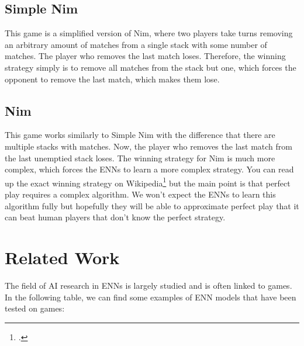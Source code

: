 \documentclass[11pt]{report}
\begin{document}
\begin{enumerate}
    \subsection{Simple Nim}\label{subsec:simple-nim}
    This game is a simplified version of Nim, where two players take turns removing an arbitrary amount of matches from a single stack with some number of matches.
    The player who removes the last match loses.
    Therefore, the winning strategy simply is to remove all matches from the stack but one, which forces the opponent to remove the last match, which makes them lose.
    \subsection{Nim}\label{subsec:nim}
    This game works similarly to Simple Nim with the difference that there are multiple stacks with matches.
    Now, the player who removes the last match from the last unemptied stack loses.
    The winning strategy for Nim is much more complex, which forces the ENNs to learn a more complex strategy.
    You can read up the exact winning strategy on Wikipedia\footcite{nim_23} but the main point is that perfect play requires a complex algorithm.
    We won't expect the ENNs to learn this algorithm fully but hopefully they will be able to approximate perfect play that it can beat human players that don't know the perfect strategy.
    \section{Related Work}\label{sec:related-work}
    The field of AI research in ENNs is largely studied and is often linked to games.
    In the following table, we can find some examples of ENN models that have been tested on games:


\end{enumerate}
\end{document}
